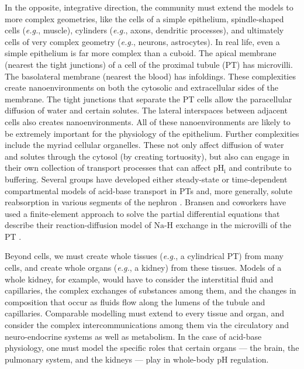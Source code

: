 \documentclass[fleqn,10pt]{physiome}
\begin{document}
In the opposite, integrative direction, the community must extend the models to more complex geometries, like the cells of a simple epithelium, spindle-shaped cells (\emph{e.g.}, muscle), cylinders (\emph{e.g.}, axons, dendritic processes), and ultimately cells of very complex geometry (\emph{e.g.}, neurons, astrocytes). In real life, even a simple epithelium is far more complex than a cuboid. The apical membrane (nearest the tight junctions) of a cell of the proximal tubule (PT) has microvilli. The basolateral membrane (nearest the blood) has infoldings. These complexities create nanoenvironments on both the cytosolic and extracellular sides of the membrane. The tight junctions that separate the PT cells allow the paracellular diffusion of water and certain solutes. The lateral interspaces between adjacent cells also creates nanoenvironments. All of these nanoenvironments are likely to be extremely important for the physiology of the epithelium. Further complexities include the myriad cellular organelles. These not only affect diffusion of water and solutes through the cytosol (by creating tortuosity), but also can engage in their own collection of transport processes that can affect $\mathrm{pH_i}$ and contribute to buffering. Several groups have developed either steady-state or time-dependent compartmental models of acid-base transport in PTs and, more generally, solute reabsorption in various segments of the nephron \citep{thomas1994kinetic,krahn1996acid,thomas2006kidney,weinstein2007flow,weinstein2009modeling,layton2014mathematical,edwards2017cell}. Bransen and coworkers have used a finite-element approach to solve the partial differential equations that describe their reaction-diffusion model of $\mathrm{Na}$-$\mathrm{H}$ exchange in the microvilli of the PT \citep{brasen2014local}.

Beyond cells, we must create whole tissues (\emph{e.g.}, a cylindrical PT) from many cells, and create whole organs (\emph{e.g.}, a kidney) from these tissues. Models of a whole kidney, for example, would have to consider the interstitial fluid and capillaries, the complex exchanges of substances among them, and the changes in composition that occur as fluids flow along the lumens of the tubule and capillaries. Comparable modelling must extend to every tissue and organ, and consider the complex intercommunications among them via the circulatory and neuro-endocrine systems as well as metabolism. In the case of acid-base physiology, one must model the specific roles that certain organs --- the brain, the pulmonary system, and the kidneys --- play in whole-body $\mathrm{pH}$ regulation.
\end{document}
